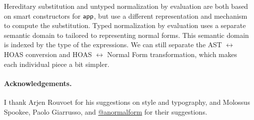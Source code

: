Hereditary substitution and untyped normalization by evaluation are both based on smart constructors for $\mathsf{app}$,
but use a different representation and mechanism to compute the substitution.
Typed normalization by evaluation uses a separate semantic domain to tailored to representing normal forms.
This semantic domain is indexed by the type of the expressions.
We can still separate the AST $\leftrightarrow$ HOAS conversion and HOAS $\leftrightarrow$ Normal Form transformation, which makes each individual piece a bit simpler.

\paragraph{Acknowledgements.} I thank Arjen Rouvoet for his suggestions on style and typography,
and Molossus Spookee, Paolo Giarrusso, and \href{https://twitter.com/anormalform}{@anormalform} for their suggestions.





